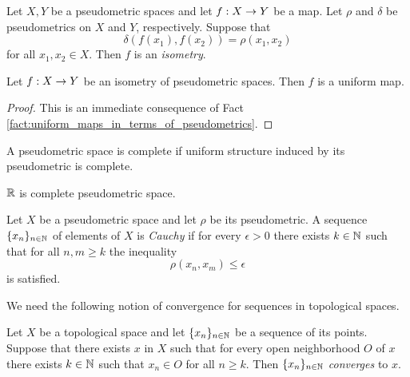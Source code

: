 \documentclass[10pt]{amsart}
\begin{document}
\begin{definition}
	Let $X,Y$ be a pseudometric spaces and let $f:X\rightarrow Y$ be a map. Let $\rho$ and $\delta$ be pseudometrics on $X$ and $Y$, respectively. Suppose that
	$$\delta\left(f(x_1),f(x_2)\right) = \rho(x_1,x_2)$$
	for all $x_1,x_2 \in X$. Then $f$ is an \textit{isometry}.
\end{definition}

\begin{corollary}\label{corollary:isometries_are_uniform_maps}
	Let $f:X\rightarrow Y$ be an isometry of pseudometric spaces. Then $f$ is a uniform map.
\end{corollary}
\begin{proof}
	This is an immediate consequence of Fact \ref{fact:uniform_maps_in_terms_of_pseudometrics}.
\end{proof}

\begin{definition}
	A pseudometric space is complete if uniform structure induced by its pseudometric is complete.
\end{definition}

\begin{example}\label{example:real_line_is_complete}
	${\mathbb R}$ is complete pseudometric space.
\end{example}

\begin{definition}
	Let $X$ be a pseudometric space and let $\rho$ be its pseudometric. A sequence $\{x_n\}_{n \in {\mathbb N}}$ of elements of $X$ is \textit{Cauchy} if for every $\epsilon > 0$ there exists $k \in {\mathbb N}$ such that for all $n,m \geq k$ the inequality
	$$\rho(x_n,x_m) \leq \epsilon$$
	is satisfied.
\end{definition}
\noindent
We need the following notion of convergence for sequences in topological spaces.

\begin{definition}
	Let $X$ be a topological space and let $\{x_n\}_{n \in {\mathbb N}}$ be a sequence of its points. Suppose that there exists $x$ in $X$ such that for every open neighborhood $O$ of $x$ there exists $k \in {\mathbb N}$ such that $x_n \in O$ for all $n \geq k$. Then $\{x_n\}_{n\in {\mathbb N}}$ \textit{converges} to $x$.
\end{definition}
\end{document}

